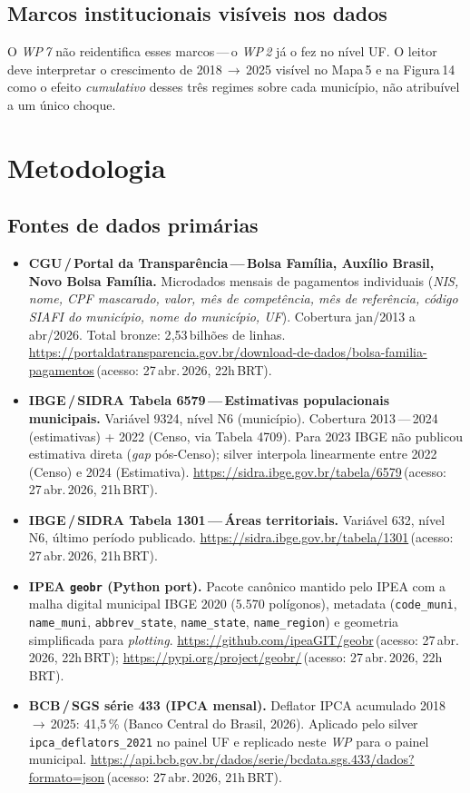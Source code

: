 \documentclass[12pt,a4paper,oneside]{article}
\newcommand{\xurl}[2]{\url{#1}\,(acesso: #2)}
\begin{document}
\subsection{Marcos institucionais visíveis nos dados}
O \textit{WP\,7} não reidentifica esses marcos\,---\,o \textit{WP\,2} já o fez
no nível UF. O leitor deve interpretar o crescimento de 2018\,$\rightarrow$\,2025
visível no Mapa\,5 e na Figura\,14 como o efeito \textit{cumulativo} desses três
regimes sobre cada município, não atribuível a um único choque.

\section{Metodologia}\label{sec:metodo}

\subsection{Fontes de dados primárias}
\begin{itemize}\itemsep4pt
\item \textbf{CGU\,/\,Portal da Transparência\,---\,Bolsa Família,
  Auxílio Brasil, Novo Bolsa Família.} Microdados mensais de pagamentos
  individuais (\textit{NIS, nome, CPF mascarado, valor, mês de
  competência, mês de referência, código SIAFI do município, nome do
  município, UF}). Cobertura jan/2013 a abr/2026. Total bronze:
  2{,}53\,bilhões de linhas.
  \xurl{https://portaldatransparencia.gov.br/download-de-dados/bolsa-familia-pagamentos}{27\,abr.\,2026, 22h\,BRT}.
\item \textbf{IBGE\,/\,SIDRA Tabela 6579\,---\,Estimativas populacionais
  municipais.} Variável 9324, nível N6 (município). Cobertura 2013\,---\,2024
  (estimativas) + 2022 (Censo, via Tabela 4709). Para 2023 IBGE não
  publicou estimativa direta (\textit{gap} pós-Censo); silver interpola
  linearmente entre 2022 (Censo) e 2024 (Estimativa).
  \xurl{https://sidra.ibge.gov.br/tabela/6579}{27\,abr.\,2026, 21h\,BRT}.
\item \textbf{IBGE\,/\,SIDRA Tabela 1301\,---\,Áreas territoriais.} Variável
  632, nível N6, último período publicado.
  \xurl{https://sidra.ibge.gov.br/tabela/1301}{27\,abr.\,2026, 21h\,BRT}.
\item \textbf{IPEA \texttt{geobr} (Python port).} Pacote canônico mantido
  pelo IPEA com a malha digital municipal IBGE 2020 (5.570 polígonos),
  metadata (\texttt{code\_muni}, \texttt{name\_muni},
  \texttt{abbrev\_state}, \texttt{name\_state}, \texttt{name\_region}) e
  geometria simplificada para \textit{plotting}.
  \xurl{https://github.com/ipeaGIT/geobr}{27\,abr.\,2026, 22h\,BRT};
  \xurl{https://pypi.org/project/geobr/}{27\,abr.\,2026, 22h\,BRT}.
\item \textbf{BCB\,/\,SGS série 433 (IPCA mensal).} Deflator IPCA
  acumulado 2018\,$\rightarrow$\,2025: 41{,}5\,\% (Banco Central do Brasil,
  2026). Aplicado pelo silver \texttt{ipca\_deflators\_2021} no painel
  UF e replicado neste \textit{WP} para o painel municipal.
  \xurl{https://api.bcb.gov.br/dados/serie/bcdata.sgs.433/dados?formato=json}{27\,abr.\,2026, 21h\,BRT}.
\end{itemize}
\end{document}
